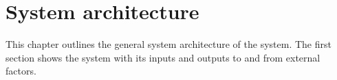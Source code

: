 \chapter{System architecture}
This chapter outlines the general system architecture of the system. The first section shows the system with its inputs and outputs to and from external factors.

\label{ch:system}



%

